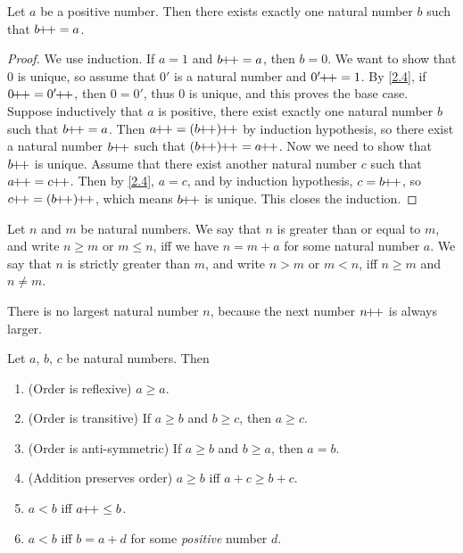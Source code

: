 \begin{lem}\label{2.2.10}
  Let \(a\) be a positive number.
  Then there exists exactly one natural number \(b\) such that \(b\!\!+\!\!+ = a\).
\end{lem}

\begin{proof}
  We use induction.
  If \(a = 1\) and \(b\!\!+\!\!+ = a\), then \(b = 0\).
  We want to show that \(0\) is unique, so assume that \(0'\) is a natural number and \(0'\!\!+\!\!+ = 1\).
  By \cref{2.4}, if \(0\pp = 0'\pp\), then \(0 = 0'\), thus \(0\) is unique, and this proves the base case.
  Suppose inductively that \(a\) is positive, there exist exactly one natural number \(b\) such that \(b\!\!+\!\!+ = a\).
  Then \(a\pp = (b\pp)\pp\) by induction hypothesis, so there exist a natural number \(b\!\!+\!\!+\) such that \((b\pp)\pp = a\pp\).
  Now we need to show that \(b\!\!+\!\!+\) is unique.
  Assume that there exist another natural number \(c\) such that \(a\pp = c\pp\).
  Then by \cref{2.4}, \(a = c\), and by induction hypothesis, \(c = b\!\!+\!\!+\), so \(c\pp = (b\pp)\pp\), which means \(b\!\!+\!\!+\) is unique.
  This closes the induction.
\end{proof}

\begin{defn}\label{2.2.11}
  Let \(n\) and \(m\) be natural numbers.
  We say that \(n\) is greater than or equal to \(m\), and write \(n \geq m\) or \(m \leq n\), iff we have \(n = m + a\) for some natural number \(a\).
  We say that \(n\) is strictly greater than \(m\), and write \(n > m\) or \(m < n\), iff \(n \geq m\) and \(n \neq m\).
\end{defn}

\begin{note}
  There is no largest natural number \(n\), because the next number \(n\!\!+\!\!+\) is always larger.
\end{note}

\begin{prop}\label{2.2.12}
  Let \(a\), \(b\), \(c\) be natural numbers.
  Then
  \begin{enumerate}
    \item (Order is reflexive) \(a \geq a\).
    \item (Order is transitive) If \(a \geq b\) and \(b \geq c\), then \(a \geq c\).
    \item (Order is anti-symmetric) If \(a \geq b\) and \(b \geq a\), then \(a = b\).
    \item (Addition preserves order) \(a \geq b\) iff \(a + c \geq b + c\).
    \item \(a < b\) iff \(a\!\!+\!\!+ \leq b\).
    \item \(a < b\) iff \(b = a + d\) for some \emph{positive} number \(d\).
  \end{enumerate}
\end{prop}

